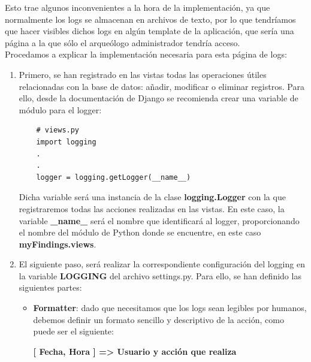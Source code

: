 Esto trae algunos inconvenientes a la hora de la implementación, ya que normalmente los
logs se almacenan en archivos de texto, por lo que tendríamos que hacer visibles dichos
logs en algún template de la aplicación, que sería una página a la que sólo el arqueólogo
administrador tendría acceso. \\

Procedamos a explicar la implementación necesaria para esta página de logs:

    \begin{enumerate}
        \item Primero, se han registrado en las vistas todas las operaciones útiles
        relacionadas con la base de datos: añadir, modificar o eliminar registros. Para
        ello, desde la documentación de Django se recomienda crear una variable de módulo
        para el logger:

    \begin{verbatim}
    # views.py
    import logging
    .
    .
    logger = logging.getLogger(__name__)
    \end{verbatim}

        Dicha variable será una instancia de la clase \textbf{logging.Logger} con la que
        registraremos todas las acciones realizadas en las vistas. En este caso, la variable
        \textbf{\_name\_} será el nombre que identificará al logger,
        proporcionando el nombre del módulo de Python donde se encuentre, en este caso
        \textbf{myFindings.views}.
        
        \item El siguiente paso, será realizar la correspondiente configuración del logging
        en la variable \textbf{LOGGING} del archivo settings.py. Para ello, se han
        definido las siguientes partes:

            \begin{itemize}
                \item \textbf{Formatter}: dado que necesitamos que los logs sean legibles
                por humanos, debemos definir un formato sencillo y descriptivo de la
                acción, como puede ser el siguiente:
                \begin{center}
                    \textbf{[ Fecha, Hora ] => Usuario y acción que realiza} 
                \end{center}


\end{itemize}
\end{enumerate}
